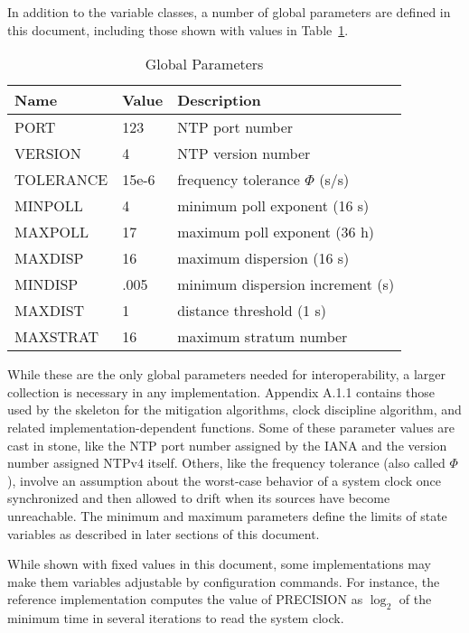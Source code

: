 In addition to the variable classes, a number of global parameters
are defined in this document, including those shown with values in
Table~\ref{global_parameters}.

\begin{table}[htb]
  \center
  \begin{tabular}{| l | l | l |}
    \hline
    Name & Value & Description \\
    \hline
    \hline
    PORT & 123 & NTP port number \\
    VERSION & 4 & NTP version number \\
    TOLERANCE & 15e-6 & frequency tolerance $ \Phi $ (s/s) \\
    MINPOLL & 4 & minimum poll exponent (16 s) \\
    MAXPOLL & 17 & maximum poll exponent (36 h) \\
    MAXDISP & 16 & maximum dispersion (16 s) \\
    MINDISP & .005 & minimum dispersion increment (s) \\
    MAXDIST & 1 & distance threshold (1 s) \\
    MAXSTRAT & 16 & maximum stratum number \\
    \hline
  \end{tabular}
  \caption{Global Parameters}
  \label{global_parameters}
\end{table}

While these are the only global parameters needed for
interoperability, a larger collection is necessary in any
implementation. Appendix A.1.1 contains those used by the skeleton
for the mitigation algorithms, clock discipline algorithm, and
related implementation-dependent functions. Some of these parameter
values are cast in stone, like the NTP port number assigned by the
IANA and the version number assigned NTPv4 itself. Others, like the
frequency tolerance (also called $ \Phi $), involve an assumption about
the worst-case behavior of a system clock once synchronized and then
allowed to drift when its sources have become unreachable. The
minimum and maximum parameters define the limits of state variables
as described in later sections of this document.

While shown with fixed values in this document, some implementations
may make them variables adjustable by configuration commands. For
instance, the reference implementation computes the value of
PRECISION as $ \log_2 $ of the minimum time in several iterations to read
the system clock.

